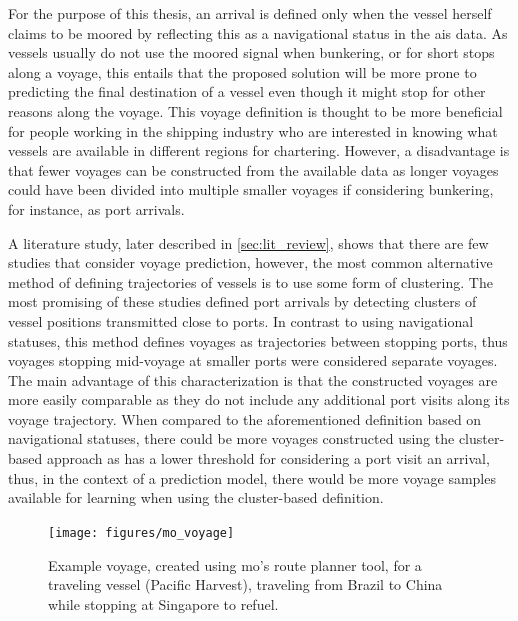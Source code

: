 For the purpose of this thesis, an arrival is defined only when the vessel herself claims to be moored by reflecting this as a navigational status in the \acrfull{ais} data. As vessels usually do not use the moored signal when bunkering, or for short stops along a voyage, this entails that the proposed solution will be more prone to predicting the final destination of a vessel even though it might stop for other reasons along the voyage. This voyage definition is thought to be more beneficial for people working in the shipping industry who are interested in knowing what vessels are available in different regions for chartering. However, a disadvantage is that fewer voyages can be constructed from the available data as longer voyages could have been divided into multiple smaller voyages if considering bunkering, for instance, as port arrivals.

A literature study, later described in \cref{sec:lit_review}, shows that there are few studies that consider voyage prediction, however, the most common alternative method of defining trajectories of vessels is to use some form of clustering. The most promising of these studies defined port arrivals by detecting clusters of vessel positions transmitted close to ports. In contrast to using navigational statuses, this method defines voyages as trajectories between stopping ports, thus voyages stopping mid-voyage at smaller ports were considered separate voyages. The main advantage of this characterization is that the constructed voyages are more easily comparable as they do not include any additional port visits along its voyage trajectory. When compared to the aforementioned definition based on navigational statuses, there could be more voyages constructed using the cluster-based approach as has a lower threshold for considering a port visit an arrival, thus, in the context of a prediction model, there would be more voyage samples available for learning when using the cluster-based definition.

\begin{figure}[htbp]
    \centering
    \texttt{[image: figures/mo\_voyage]}
    \caption{Example voyage, created using \acrshort{mo}'s route planner tool, for a traveling vessel (Pacific Harvest), traveling from Brazil to China while stopping at Singapore to refuel.}
    \label{fig:example_voyage}
\end{figure}

